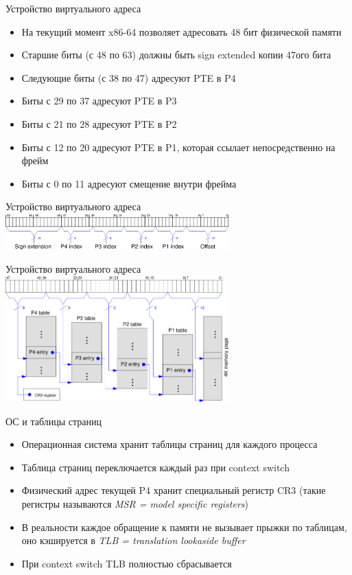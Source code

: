 \documentclass[10pt,pdf,hyperref={unicode}]{beamer}
\begin{document}
\begin{frame}{Устройство виртуального адреса}
\begin{itemize}
    \item На текущий момент x86-64 позволяет адресовать 48 бит физической памяти
    \item Старшие биты (с 48 по 63) должны быть sign extended копии 47ого бита
    \item Следующие биты (с 38 по 47) адресуют PTE в P4
    \item Биты с 29 по 37 адресуют PTE в P3
    \item Биты с 21 по 28 адресуют PTE в P2
    \item Биты с 12 по 20 адресуют PTE в P1, которая ссылает непосредственно на фрейм
    \item Биты с 0 по 11 адресуют смещение внутри фрейма
\end{itemize}
\end{frame}

\begin{frame}{Устройство виртуального адреса}
\center\includegraphics[width=325px]{x86_address_structure.png}
\end{frame}

\begin{frame}{Устройство виртуального адреса}
\center\includegraphics[width=325px]{X86_Paging_64bit.png}
\end{frame}

\begin{frame}{ОС и таблицы страниц}
\begin{itemize}
    \item Операционная система хранит таблицы страниц для каждого процесса
    \item Таблица страниц переключается каждый раз при context switch
    \item Физический адрес текущей P4 хранит специальный регистр CR3 (такие регистры называются \emph{MSR = model specific registers})
    \item В реальности каждое обращение к памяти не вызывает прыжки по таблицам, оно кэшируется в \emph{TLB = translation lookaside buffer}
    \item При context switch TLB полностью сбрасывается
\end{itemize}
\end{frame}
\end{document}
